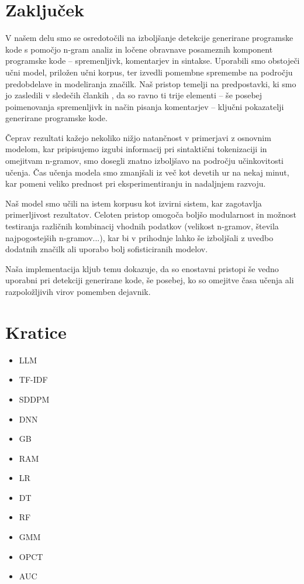 \documentclass[sigconf,nonacm]{acmart}
\begin{document}
\section{Zaključek}
V našem delu smo se osredotočili na izboljšanje detekcije generirane programske kode s pomočjo n-gram analiz in ločene obravnave posameznih komponent programske kode – spremenljivk, komentarjev in sintakse. Uporabili smo obstoječi učni model, priložen učni korpus, ter izvedli pomembne spremembe na področju predobdelave in modeliranja značilk. Naš pristop temelji na predpostavki, ki smo jo zasledili v sledečih člankih \cite{oedingen2024chatgpt, xu2024distinguishing, gurioli2024you}, da so ravno ti trije elementi – še posebej poimenovanja spremenljivk in način pisanja komentarjev – ključni pokazatelji generirane programske kode.

Čeprav rezultati kažejo nekoliko nižjo natančnost v primerjavi z osnovnim modelom, kar pripisujemo izgubi informacij pri sintaktični tokenizaciji in omejitvam n-gramov, smo dosegli znatno izboljšavo na področju učinkovitosti učenja. Čas učenja modela smo zmanjšali iz več kot devetih ur na nekaj minut, kar pomeni veliko prednost pri eksperimentiranju in nadaljnjem razvoju.

Naš model smo učili na istem korpusu kot izvirni sistem, kar zagotavlja primerljivost rezultatov. Celoten pristop omogoča boljšo modularnost in možnost testiranja različnih kombinacij vhodnih podatkov (velikost n-gramov, števila najpogostejših n-gramov...), kar bi v prihodnje lahko še izboljšali z uvedbo dodatnih značilk ali uporabo bolj sofisticiranih modelov.

Naša implementacija kljub temu dokazuje, da so enostavni pristopi še vedno uporabni pri detekciji generirane kode, še posebej, ko so omejitve časa učenja ali razpoložljivih virov pomemben dejavnik.

\section*{Kratice}
\begin{itemize}
	\item \acrfull{LLM}
	\item \acrfull{TF-IDF}
	\item \acrfull{SDDPM}
	\item \acrfull{DNN}
	\item \acrfull{GB}
	\item \acrfull{RAM}
	\item \acrfull{LR}
	\item \acrfull{DT}
	\item \acrfull{RF}
	\item \acrfull{GMM}
	\item \acrfull{OPCT}
	\item \acrfull{AUC}
\end{itemize}

\renewcommand\refname{Literatura} 


\end{document}
